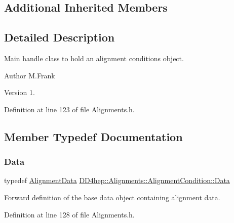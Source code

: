 \subsection*{Additional Inherited Members}


\subsection{Detailed Description}
Main handle class to hold an alignment conditions object. 

\begin{DoxyAuthor}{Author}
M.\+Frank 
\end{DoxyAuthor}
\begin{DoxyVersion}{Version}
1. 
\end{DoxyVersion}


Definition at line 123 of file Alignments.\+h.



\subsection{Member Typedef Documentation}
\hypertarget{class_d_d4hep_1_1_alignments_1_1_alignment_condition_a6fcd9bd0e9ac67afcf43270cbd9e9983}{}\label{class_d_d4hep_1_1_alignments_1_1_alignment_condition_a6fcd9bd0e9ac67afcf43270cbd9e9983} 
\subsubsection{\texorpdfstring{Data}{Data}}
{\footnotesize\ttfamily typedef \hyperlink{class_d_d4hep_1_1_alignments_1_1_alignment_data}{Alignment\+Data} \hyperlink{class_d_d4hep_1_1_alignments_1_1_alignment_condition_a6fcd9bd0e9ac67afcf43270cbd9e9983}{D\+D4hep\+::\+Alignments\+::\+Alignment\+Condition\+::\+Data}}



Forward definition of the base data object containing alignment data. 



Definition at line 128 of file Alignments.\+h.

\hypertarget{class_d_d4hep_1_1_alignments_1_1_alignment_condition_a7a0f38a79212c07c444c8c8cd512bbd6}{}\label{class_d_d4hep_1_1_alignments_1_1_alignment_condition_a7a0f38a79212c07c444c8c8cd512bbd6} 
